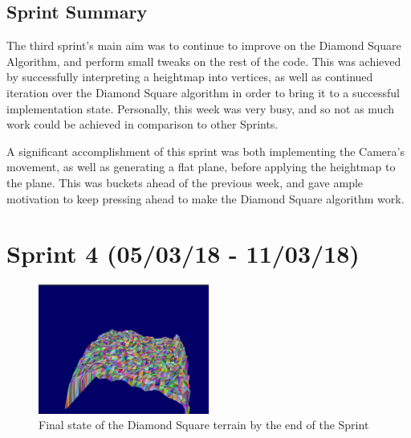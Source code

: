 \documentclass[a4paper,10pt]{report}
\begin{document}
\subsection{Sprint Summary}
The third sprint's main aim was to continue to improve on the Diamond Square Algorithm, and perform small tweaks on the rest of the code. This was achieved by successfully interpreting a heightmap into vertices, as well as continued iteration over the Diamond Square algorithm in order to bring it to a successful implementation state. Personally, this week was very busy, and so not as much work could be achieved in comparison to other Sprints. \medskip

A significant accomplishment of this sprint was both implementing the Camera's movement, as well as generating a flat plane, before applying the heightmap to the plane. This was buckets ahead of the previous week, and gave ample motivation to keep pressing ahead to make the Diamond Square algorithm work. 

\clearpage
\section{Sprint 4 (05/03/18 - 11/03/18)}

\begin{figure}[h!]
    \centering
  \includegraphics[width=0.5\textwidth]{Images/Sprint-Images/Sprint4-7.png}
 \caption{Final state of the Diamond Square terrain by the end of the Sprint}
 \label{fig:sprint4-1}
\end{figure}
\end{document}
